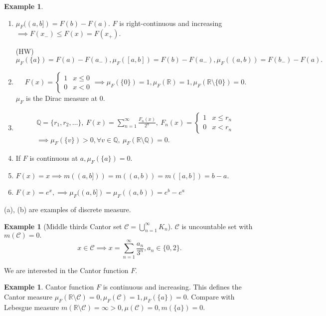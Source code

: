 \documentclass{report}
\newcommand{\R}{\mathbb{R}}
\newcommand{\Q}{\mathbb{Q}}
\theoremstyle{definition}
\newtheorem{example}[theorem]{Example}
\theoremstyle{remark}
\newcommand{\fnl}{\parbox[t]{0\linewidth}{}}
\begin{document}
\begin{example}\fnl
\begin{enumerate}
\item $\mu_F((a, b]) = F(b) - F(a)$. $F$ is right-continuous and increasing $\implies F(x_-) \leq F(x) = F(x_+)$.

(HW) $\mu_F(\{a\}) = F(a) - F(a_-), \mu_F([a, b]) = F(b) - F(a_-), \mu_F((a, b)) = F(b_-) - F(a).$

\item
\[F(x) = \begin{cases}
1 & x \leq 0 \\ 0 & x < 0
\end{cases} \implies \mu_F(\{0\}) = 1, \mu_F(\R) = 1, \mu_F(\R \setminus \{0\}) = 0.
\]
$\mu_F$ is the Dirac measure at $0$.

\item
\begin{multline*}
\Q = \{r_1, r_2, \ldots\},\ F(x) = \sum_{n=1}^\infty \frac{F_n(x)}{2^n},\ F_n(x) = \begin{cases}
1 & x \leq r_n \\ 0 & x < r_n
\end{cases} \\
\implies \mu_F(\{v\}) > 0, \forall v \in \Q,\ \mu_F(\R \setminus \Q) = 0.
\end{multline*}

\item 
If $F$ is continuous at $a, \mu_F(\{a\}) = 0$.

\item
$F(x) = x \implies m((a, b])) = m((a, b)) = m([a, b]) = b - a.$

\item
$F(x) = e^x, \implies \mu_F((a, b]) = \mu_F((a, b)) = e^b - e^a$
\end{enumerate}
(a), (b) are examples of discrete measure.
\end{example}

\begin{example}
[Middle thirds Cantor set $\mathcal{C} = \bigcup_{n=1}^\infty K_n$]\fnl

$\mathcal{C}$ is uncountable set with $m(\mathcal{C}) = 0.$
\[x \in \mathcal{C} \implies x = \sum_{n=1}^\infty \frac{a_n}{3^n}, a_n \in \{0, 2\}.\]

We are interested in the Cantor function $F$.
\end{example}

\begin{example}
Cantor function $F$ is continuous and increasing.
This defines the Cantor measure $\mu_F(\R \setminus \mathcal{C}) = 0, \mu_F(\mathcal{C}) = 1, \mu_F(\{a\}) = 0.$ Compare with Lebesgue measure $m(\R \setminus \mathcal{C}) = \infty > 0, \mu(\mathcal{C}) = 0, m(\{a\}) = 0$.
\end{example}
\end{document}
